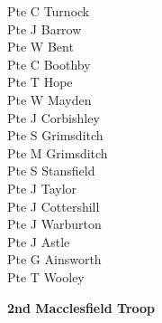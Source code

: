 \begin{multicols}{2}
  Pte C Turnock \\
  Pte J Barrow \\
  Pte W Bent \\
  Pte C Boothby \\
  Pte T Hope \\
  Pte W Mayden \\
  Pte J Corbishley \\
  Pte S Grimsditch \\
  Pte M Grimsditch \\
  Pte S Stansfield \\
  Pte J Taylor \\
  Pte J Cottershill \\
  Pte J Warburton \\
  Pte J Astle \\
  Pte G Ainsworth \\
  Pte T Wooley \\
\end{multicols}

\begin{center}
  \Large
  \textbf{2nd Macclesfield Troop}
\end{center}

